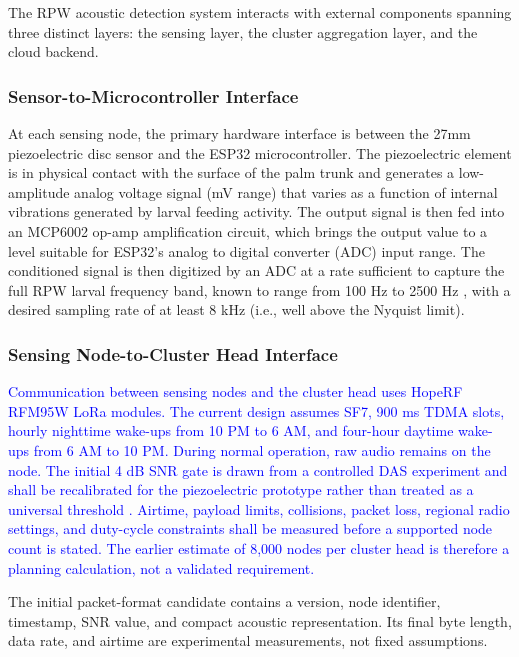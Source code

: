 \documentclass[12pt,a4paper,oneside]{memoir}
\newcommand{\earlierrevision}[1]{\textcolor{blue}{#1}}
\newcommand{\newrevision}[1]{\textcolor{green!45!black}{#1}}
\begin{document}
The RPW acoustic detection system interacts with external components spanning three distinct layers: the sensing layer, the cluster aggregation layer, and the cloud backend.
 
\subsubsection*{Sensor-to-Microcontroller Interface}
 
At each sensing node, the primary hardware interface is between the 27mm piezoelectric disc sensor and the ESP32 microcontroller. The piezoelectric element is in physical contact with the surface of the palm trunk and generates a low-amplitude analog voltage signal (mV range) that varies as a function of internal vibrations generated by larval feeding activity. The output signal is then fed into an MCP6002 op-amp amplification circuit, which brings the output value to a level suitable for ESP32's analog to digital converter (ADC) input range. The conditioned signal is then digitized by an ADC at a rate sufficient to capture the full RPW larval frequency band, known to range from 100 Hz to 2500 Hz \cite{pinhas2008,rach2013}, with a desired sampling rate of at least 8 kHz (i.e., well above the Nyquist limit).
 
\subsubsection*{Sensing Node-to-Cluster Head Interface}
 
\earlierrevision{Communication between sensing nodes and the cluster head uses HopeRF RFM95W LoRa modules. The current design assumes SF7, 900 ms TDMA slots, hourly nighttime wake-ups from 10 PM to 6 AM, and four-hour daytime wake-ups from 6 AM to 10 PM. During normal operation, raw audio remains on the node. The initial 4 dB SNR gate is drawn from a controlled DAS experiment and shall be recalibrated for the piezoelectric prototype rather than treated as a universal threshold \cite{ashry2020}. Airtime, payload limits, collisions, packet loss, regional radio settings, and duty-cycle constraints shall be measured before a supported node count is stated. The earlier estimate of 8,000 nodes per cluster head is therefore a planning calculation, not a validated requirement.}

\newrevision{The initial packet-format candidate contains a version, node identifier, timestamp, SNR value, and compact acoustic representation. Its final byte length, data rate, and airtime are experimental measurements, not fixed assumptions.}
 
\end{document}
